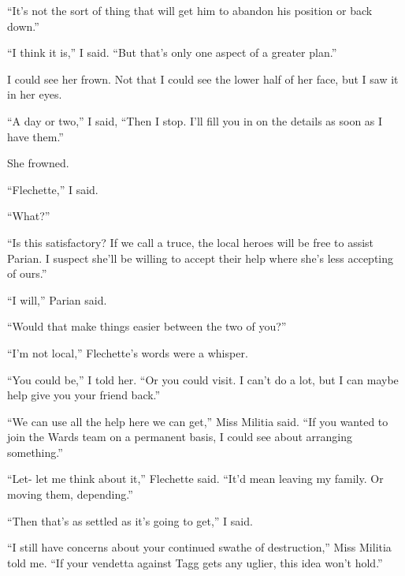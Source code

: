 ``It's not the sort of thing that will get him to abandon his position or back down.''



``I think it is,'' I said.  ``But that's only one aspect of a greater plan.''



I could see her frown.  Not that I could see the lower half of her face, but I saw it in her eyes.



``A day or two,'' I said, ``Then I stop.  I'll fill you in on the details as soon as I have them.''



She frowned.



``Flechette,'' I said.



``What?''



``Is this satisfactory?  If we call a truce, the local heroes will be free to assist Parian.  I suspect she'll be willing to accept their help where she's less accepting of ours.''



``I will,'' Parian said.



``Would that make things easier between the two of you?''



``I'm not local,'' Flechette's words were a whisper.



``You could be,'' I told her.  ``Or you could visit.  I can't do a lot, but I can maybe help give you your friend back.''



``We can use all the help here we can get,'' Miss Militia said.  ``If you wanted to join the Wards team on a permanent basis, I could see about arranging something.''



``Let- let me think about it,'' Flechette said.  ``It'd mean leaving my family.  Or moving them, depending.''



``Then that's as settled as it's going to get,'' I said.



``I still have concerns about your continued swathe of destruction,'' Miss Militia told me.  ``If your vendetta against Tagg gets any uglier, this idea won't hold.''



